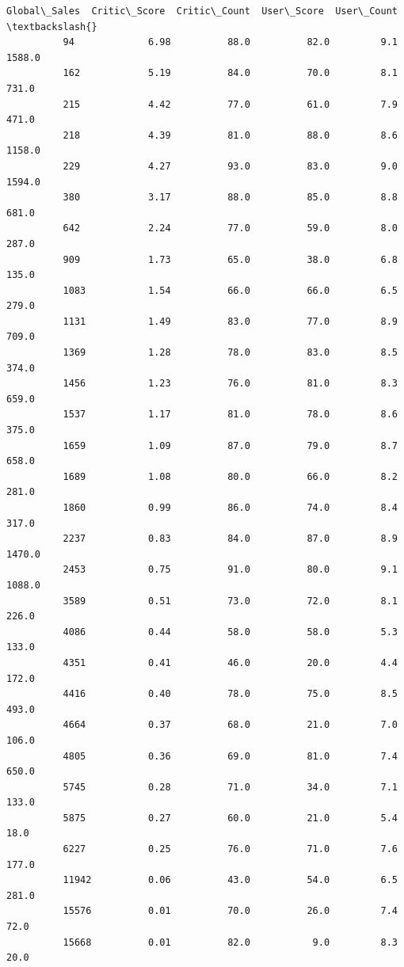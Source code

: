 \documentclass[11pt]{article}
\begin{document}
\begin{Verbatim}[commandchars=\\\{\}]
                 Global\_Sales  Critic\_Score  Critic\_Count  User\_Score  User\_Count  \textbackslash{}
          94             6.98          88.0          82.0         9.1      1588.0   
          162            5.19          84.0          70.0         8.1       731.0   
          215            4.42          77.0          61.0         7.9       471.0   
          218            4.39          81.0          88.0         8.6      1158.0   
          229            4.27          93.0          83.0         9.0      1594.0   
          380            3.17          88.0          85.0         8.8       681.0   
          642            2.24          77.0          59.0         8.0       287.0   
          909            1.73          65.0          38.0         6.8       135.0   
          1083           1.54          66.0          66.0         6.5       279.0   
          1131           1.49          83.0          77.0         8.9       709.0   
          1369           1.28          78.0          83.0         8.5       374.0   
          1456           1.23          76.0          81.0         8.3       659.0   
          1537           1.17          81.0          78.0         8.6       375.0   
          1659           1.09          87.0          79.0         8.7       658.0   
          1689           1.08          80.0          66.0         8.2       281.0   
          1860           0.99          86.0          74.0         8.4       317.0   
          2237           0.83          84.0          87.0         8.9      1470.0   
          2453           0.75          91.0          80.0         9.1      1088.0   
          3589           0.51          73.0          72.0         8.1       226.0   
          4086           0.44          58.0          58.0         5.3       133.0   
          4351           0.41          46.0          20.0         4.4       172.0   
          4416           0.40          78.0          75.0         8.5       493.0   
          4664           0.37          68.0          21.0         7.0       106.0   
          4805           0.36          69.0          81.0         7.4       650.0   
          5745           0.28          71.0          34.0         7.1       133.0   
          5875           0.27          60.0          21.0         5.4        18.0   
          6227           0.25          76.0          71.0         7.6       177.0   
          11942          0.06          43.0          54.0         6.5       281.0   
          15576          0.01          70.0          26.0         7.4        72.0   
          15668          0.01          82.0           9.0         8.3        20.0   
          

\end{Verbatim}
\end{document}
